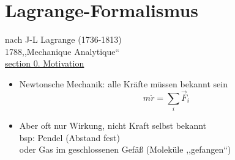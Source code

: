 \documentclass[titlepage,12pt,a4paper,ngerman]{report}
\begin{document}
{%

\chapter{Lagrange-Formalismus}
nach J-L Lagrange (1736-1813)\\
1788,,Mechanique Analytique``\\
\underline{\underline{section 0. Motivation}}
\begin{itemize}
	\item Newtonsche Mechanik: alle Kräfte müssen bekannt sein
	$$ m\ddot{r} = \sum_i \vec{F}_i$$
	\item Aber oft nur Wirkung, nicht Kraft selbst bekannt\\
	bsp: Pendel (Abstand fest) \\
	oder Gas im geschlossenen Gefäß (Moleküle ,,gefangen``)
\end{itemize}
}
\end{document}
